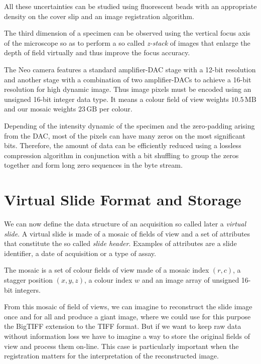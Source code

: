 \documentclass[letterpaper,compsoc,twoside]{IEEEtran}
\begin{document}
All these uncertainties can be studied using fluorescent beads with an appropriate density on the
cover slip and an image registration algorithm.

The third dimension of a specimen can be observed using the vertical focus axis of the microscope
so as to perform a so called \emph{z-stack} of images that enlarge the depth of field virtually and thus
improve the focus accuracy.

The Neo camera features a standard amplifier-DAC stage with a 12-bit resolution and
another stage with a combination of two amplifier-DACs to achieve a 16-bit resolution for high
dynamic image. Thus image pixels must be encoded using an unsigned 16-bit integer data type. It
means a colour field of view weights $10.5\,\text{MB}$ and our mosaic weights
$23\,\text{GB}$ per colour.

Depending of the intensity dynamic of the specimen and the zero-padding arising from the DAC, most
of the pixels can have many zeros on the most significant bits. Therefore, the amount of
data can be efficiently reduced using a lossless compression algorithm in conjunction with a bit
shuffling to group the zeros together and form long zero sequences in the byte stream.

\section{Virtual Slide Format and Storage\label{virtual-slide-format-and-storage}}


We can now define the data structure of an acquisition so called later a \emph{virtual slide}.  A virtual
slide is made of a mosaic of fields of view and a set of attributes that constitute the so called
\emph{slide header}. Examples of attributes are a slide identifier, a date of acquisition or a type of assay.

The mosaic is a set of colour fields of view made of a mosaic index $(r,c)$, a stagger
position $(x,y,z)$, a colour index $w$ and an image array of unsigned 16-bit integers.

From this mosaic of field of views, we can imagine to reconstruct the slide image once and for all
and produce a giant image, where we could use for this purpose the BigTIFF \cite{BigTIFF} extension to
the TIFF format. But if we want to keep raw data without information loss we have to imagine a way
to store the original fields of view and process them on-line. This case is particularly important
when the registration matters for the interpretation of the reconstructed image.
\end{document}
